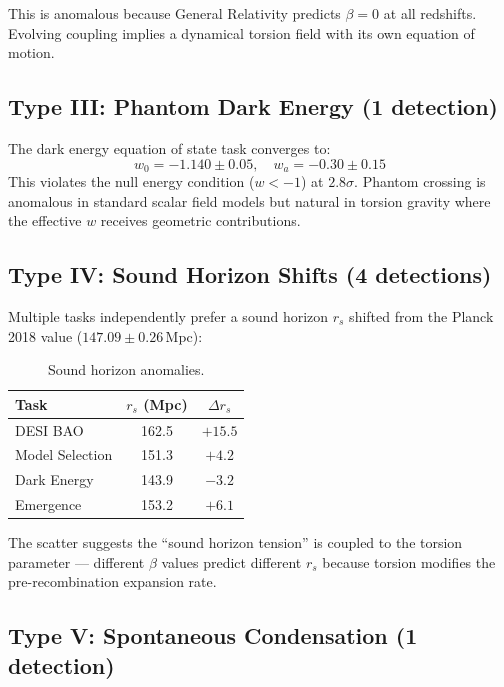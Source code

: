 \documentclass[twocolumn,showpacs,preprintnumbers,amsmath,amssymb,prl]{revtex4-2}
\begin{document}
This is anomalous because General Relativity predicts $\beta = 0$ at all redshifts. Evolving coupling implies a dynamical torsion field with its own equation of motion.

\subsection{Type III: Phantom Dark Energy (1 detection)}

The dark energy equation of state task converges to:
\begin{equation}
w_0 = -1.140 \pm 0.05, \quad w_a = -0.30 \pm 0.15
\end{equation}
This violates the null energy condition ($w < -1$) at $2.8\sigma$. Phantom crossing is anomalous in standard scalar field models but natural in torsion gravity where the effective $w$ receives geometric contributions.

\subsection{Type IV: Sound Horizon Shifts (4 detections)}

Multiple tasks independently prefer a sound horizon $r_s$ shifted from the Planck 2018 value ($147.09 \pm 0.26$\,Mpc):

\begin{table}[h]
\caption{Sound horizon anomalies.}
\begin{ruledtabular}
\begin{tabular}{lcc}
Task & $r_s$ (Mpc) & $\Delta r_s$ \\
\hline
DESI BAO & 162.5 & $+15.5$ \\
Model Selection & 151.3 & $+4.2$ \\
Dark Energy & 143.9 & $-3.2$ \\
Emergence & 153.2 & $+6.1$ \\
\end{tabular}
\end{ruledtabular}
\end{table}

The scatter suggests the ``sound horizon tension'' is coupled to the torsion parameter --- different $\beta$ values predict different $r_s$ because torsion modifies the pre-recombination expansion rate.

\subsection{Type V: Spontaneous Condensation (1 detection)}
\end{document}
